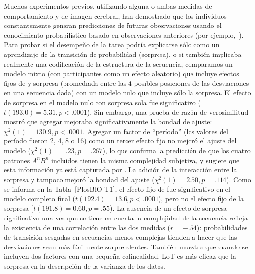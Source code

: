 Muchos experimentos previos, utilizando alguna o ambas medidas de comportamiento y de imagen cerebral, han demostrado que los individuos constantemente generan predicciones de futuras observaciones usando el conocimiento probabilístico basado en observaciones anteriores (por ejemplo,~\cite{f19,f20}). Para probar si el desempeño de la tarea podría explicarse sólo como un aprendizaje de la transición de probabilidad (sorpresa), o si también implicaba realmente una codificación de la estructura de la secuencia, comparamos un modelo mixto (con participantes como un efecto aleatorio) que incluye efectos fijos de \mdlbin y sorpresa (promediada entre las 4 posibles posiciones de las desviaciones en una secuencia dada) con un modelo nulo que incluye sólo la sorpresa. El efecto de sorpresa en el modelo nulo con sorpresa sola fue significativo ($t(193.0) = 5.31, p < .0001$). Sin embargo, una prueba de razón de verosimilitud mostró que agregar \mdlbin mejoraba significativamente la bondad de ajuste: $\chi^2(1) = 130.9, p < .0001$. Agregar un factor de ``período'' (los valores del período fueron 2, 4, 8 o 16) como un tercer efecto fijo no mejoró el ajuste del modelo ($\chi^2(1) = 1.23, p = .267$), lo que confirma la predicción de que los cuatro patrones $A^n B^n$ incluidos tienen la misma complejidad subjetiva, y sugiere que esta información ya está capturada por \mdlbin. La adición de la interacción entre la sorpresa y \mdlbin tampoco mejoró la bondad del ajuste ($\chi^2(1) = 2.50, p = . 114$). Como se informa en la Tabla~\ref{PlosBIO-T1}, el efecto fijo de \mdlbin fue significativo en el modelo completo final ($t(192.4) = 13.6, p < .0001$), pero no el efecto fijo de la sorpresa ($t (191.8) = 0.60, p = .55$). La ausencia de un efecto de sorpresa significativo una vez que se tiene en cuenta la complejidad de la secuencia refleja la existencia de una correlación entre las dos medidas ($r = -.54$): probabilidades de transición sesgadas en secuencias menos complejas tienden a hacer que las desviaciones sean más fácilmente sorprendentes. También muestra que cuando se incluyen dos factores con una pequeña colinealidad, LoT es más eficaz que la sorpresa en la descripción de la varianza de los datos.


